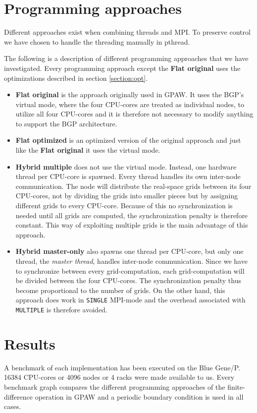 \documentclass[conference]{IEEEtran}
\begin{document}
\section{Programming approaches}
Different approaches exist when combining threads and MPI. To preserve control we have chosen to handle the threading manually in pthread.

The following is a description of different programming approaches that we have investigated. Every programming approach except the \textbf{Flat original} uses the optimizations described in section \ref{section:opt}.

\begin{itemize}
 \item \textbf{Flat original} is the approach originally used in GPAW. It uses the BGP's virtual mode, where the four CPU-cores are treated as individual nodes, to utilize all four CPU-cores and it is therefore not necessary to modify anything to support the BGP architecture.

 \item \textbf{Flat optimized} is an optimized version of the original approach and just like the \textbf{Flat original} it uses the virtual mode.

 \item \textbf{Hybrid multiple} does not use the virtual mode. Instead, one hardware thread per CPU-core is spawned. Every thread handles its own inter-node communication. The node will distribute the real-space grids between its four CPU-cores, not by dividing the grids into smaller pieces but by assigning different grids to every CPU-core. Because of this no synchronization is needed until all grids are computed, the synchronization penalty is therefore constant. This way of exploiting multiple grids is the main advantage of this approach.

 \item \textbf{Hybrid master-only} also spawns one thread per CPU-core, but only one thread, the \emph{master thread}, handles inter-node communication. Since we have to synchronize between every grid-computation, each grid-computation will be divided between the four CPU-cores. The synchronization penalty thus become proportional to the number of grids. On the other hand, this approach does work in \texttt{SINGLE} MPI-mode and the overhead associated with \texttt{MULTIPLE} is therefore avoided.
\end{itemize}

\section{Results}
A benchmark of each implementation has been executed on the Blue Gene/P. 16384 CPU-cores or 4096 nodes or 4 racks were made available to us. Every benchmark graph compares the different programming approaches of the finite-difference operation in GPAW and a periodic boundary condition is used in all cases.
\end{document}
